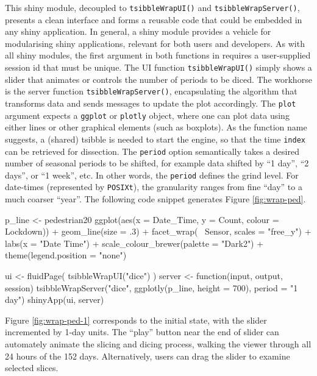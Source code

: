 This shiny module, decoupled to \texttt{tsibbleWrapUI()} and
\texttt{tsibbleWrapServer()}, presents a clean interface and forms a
reusable code that could be embedded in any shiny application. In
general, a shiny module provides a vehicle for modularising shiny
applications, relevant for both users and developers. As with all shiny
modules, the first argument in both functions in 
requires a user-supplied session id that must be unique. The UI function
\texttt{tsibbleWrapUI()} simply shows a slider that animates or controls
the number of periods to be diced. The workhorse is the server function
\texttt{tsibbleWrapServer()}, encapsulating the algorithm that
transforms data and sends messages to update the plot accordingly. The
\texttt{plot} argument expects a \texttt{ggplot} or \texttt{plotly}
object, where one can plot data using either lines or other graphical
elements (such as boxplots). As the function name suggests, a (shared)
tsibble is needed to start the engine, so that the time \texttt{index}
can be retrieved for dissection. The \texttt{period} option semantically
takes a desired number of seasonal periods to be shifted, for example
data shifted by ``1 day'', ``2 days'', or ``1 week'', etc. In other
words, the \texttt{period} defines the grind level. For date-times
(represented by \texttt{POSIXt}), the granularity ranges from fine
``day'' to a much coarser ``year''. The following code snippet generates
Figure \ref{fig:wrap-ped}.

\begin{Schunk}
\begin{Sinput}
p_line <- pedestrian20 %
  ggplot(aes(x = Date_Time, y = Count, colour = Lockdown)) +
  geom_line(size = .3) +
  facet_wrap(~ Sensor, scales = "free_y") +
  labs(x = "Date Time") +
  scale_colour_brewer(palette = "Dark2") +
  theme(legend.position = "none")

ui <- fluidPage(
  tsibbleWrapUI("dice")
)
server <- function(input, output, session) {
  tsibbleWrapServer("dice", ggplotly(p_line, height = 700), period = "1 day")
}
shinyApp(ui, server)
\end{Sinput}
\end{Schunk}

Figure \ref{fig:wrap-ped-1} corresponds to the initial state, with the
slider incremented by 1-day units. The ``play'' button near the end of
slider can automately animate the slicing and dicing process, walking
the viewer through all 24 hours of the 152 days. Alternatively, users
can drag the slider to examine selected slices.

